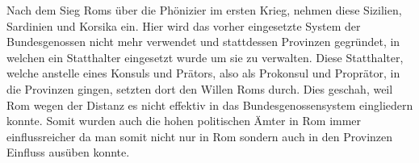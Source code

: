 \documentclass{article}
\begin{document}
	Nach dem Sieg Roms über die Phönizier im ersten Krieg, nehmen diese Sizilien, Sardinien und Korsika ein. Hier wird das vorher eingesetzte System der Bundesgenossen nicht mehr verwendet und stattdessen Provinzen gegründet, in welchen ein Statthalter eingesetzt wurde um sie zu verwalten. Diese Statthalter, welche anstelle eines Konsuls und Prätors, also als Prokonsul und Proprätor, in die Provinzen gingen, setzten dort den Willen Roms durch. Dies geschah, weil Rom wegen der Distanz es nicht effektiv in das Bundesgenossensystem eingliedern konnte. Somit wurden auch die hohen politischen Ämter in Rom immer einflussreicher da man somit nicht nur in Rom sondern auch in den Provinzen Einfluss ausüben konnte. \\
	














	
\end{document}
